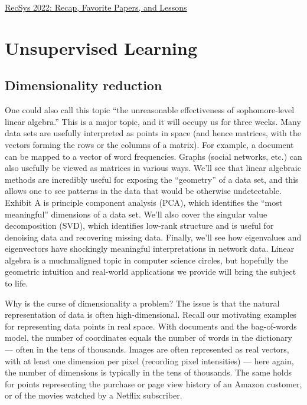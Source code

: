 \documentclass[openany]{book}
\begin{document}
\href{https://eugeneyan.com/writing/recsys2022/?utm_campaign=Data_Elixir&utm_source=Data_Elixir_408/}{RecSys 2022: Recap, Favorite Papers, and Lessons
}



\chapter{Unsupervised Learning}


\section{Dimensionality reduction}
One could also call this topic “the unreasonable effectiveness of sophomore-level linear algebra.” This is a major topic, and it will
occupy us for three weeks. Many data sets are usefully interpreted as points in space
(and hence matrices, with the vectors forming the rows or the columns of a matrix).
For example, a document can be mapped to a vector of word frequencies. Graphs
(social networks, etc.) can also usefully be viewed as matrices in various ways. We’ll see that linear algebraic methods are incredibly useful for exposing the “geometry”
of a data set, and this allows one to see patterns in the data that would be otherwise undetectable. Exhibit A is principle component analysis (PCA), which identifies
the “most meaningful” dimensions of a data set. We’ll also cover the singular value
decomposition (SVD), which identifies low-rank structure and is useful for denoising
data and recovering missing data. Finally, we’ll see how eigenvalues and eigenvectors
have shockingly meaningful interpretations in network data. Linear algebra is a muchmaligned topic in computer science circles, but hopefully the geometric intuition and
real-world applications we provide will bring the subject to life.


Why is the curse of dimensionality a problem? The issue is that the natural representation of data is often high-dimensional. Recall our motivating examples for representing data points in real space. With documents and the bag-of-words model, the number of coordinates equals the number of words in the dictionary — often in the tens of thousands. Images are often represented as real vectors, with at least one dimension per pixel (recording pixel intensities) — here again, the number of dimensions is typically in the tens of thousands. The same holds for points representing the purchase or page view history of an Amazon customer, or of the movies watched by a Netflix subscriber.
\end{document}
